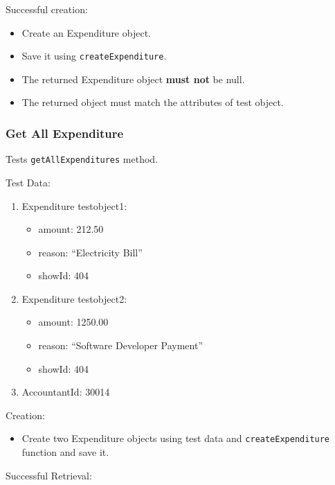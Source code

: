 \documentclass[]{article}
\providecommand{\tightlist}{%
  \setlength{\itemsep}{0pt}\setlength{\parskip}{0pt}}
\begin{document}
Successful creation:

\begin{itemize}
\tightlist
\item
  Create an Expenditure object.
\item
  Save it using \texttt{createExpenditure}.
\item
  The returned Expenditure object \textbf{must not} be null.
\item
  The returned object must match the attributes of test object.
\end{itemize}

\hypertarget{get-all-expenditure}{%
\subsubsection{Get All Expenditure}\label{get-all-expenditure}}

Tests \texttt{getAllExpenditures} method.

Test Data:

\begin{enumerate}
\def\labelenumi{\arabic{enumi}.}
\tightlist
\item
  Expenditure testobject1:

  \begin{itemize}
  \tightlist
  \item
    amount: 212.50
  \item
    reason: ``Electricity Bill''
  \item
    showId: 404
  \end{itemize}
\item
  Expenditure testobject2:

  \begin{itemize}
  \tightlist
  \item
    amount: 1250.00
  \item
    reason: ``Software Developer Payment''
  \item
    showId: 404
  \end{itemize}
\item
  AccountantId: 30014
\end{enumerate}

Creation:

\begin{itemize}
\tightlist
\item
  Create two Expenditure objects using test data and
  \texttt{createExpenditure} function and save it.
\end{itemize}

Successful Retrieval:
\end{document}
